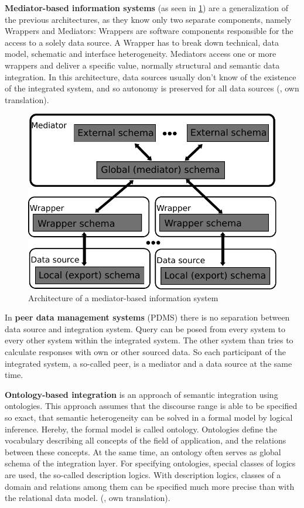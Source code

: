 \textbf{Mediator-based information systems} (as seen in \ref{MediatorBasedArchitecture}) are a generalization of the previous architectures, as they know only two separate components, namely Wrappers and Mediators: Wrappers are software components responsible for the access to a solely data source. A Wrapper has to break down technical, data model, schematic and interface heterogeneity. Mediators access one or more wrappers and deliver a specific value, normally structural and semantic data integration.
In this architecture, data sources usually don't know of the existence of the integrated system, and so autonomy is preserved for all data sources (\cite[p. 97]{DBLP:books/dp/LeserN2006}, own translation).
\begin{figure}[H]
	\begin{center}
		\includegraphics[scale=0.5]{figures/MediatorBasedArchitecture.pdf}
	\end{center}
	\caption{Architecture of a  mediator-based information system}
	\label{MediatorBasedArchitecture}
\end{figure}
In \textbf{peer data management systems} (PDMS) there is no separation between data source and integration system. Query can be posed from every system to every other system within the integrated system. The other system than tries to calculate responses with own or other sourced data. So each participant of the integrated system, a so-called peer, is a mediator and a data source at the same time.  

\textbf{Ontology-based integration} is an approach of semantic integration using ontologies. This approach assumes that the discourse range is able to be specified so exact, that semantic heterogeneity can be solved in a formal model by logical inference. Hereby, the formal model is called ontology. Ontologies define the vocabulary describing all concepts of the field of application, and the relations between these concepts. At the same time, an ontology often serves as global schema of the integration layer. For specifying ontologies, special classes of logics are used, the so-called description logics. With description logics, classes of a domain and relations among them can be specified much more precise than with the relational data model. (\cite[p. 267]{DBLP:books/dp/LeserN2006}, own translation).\\